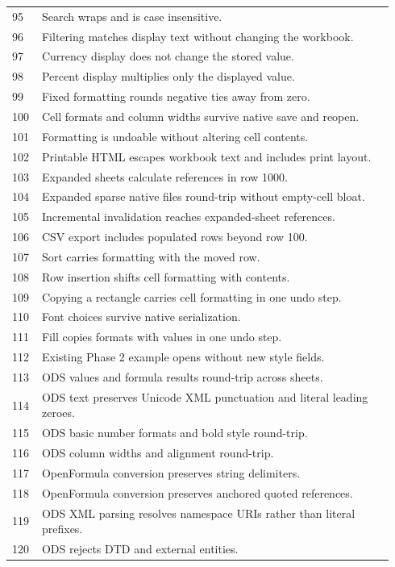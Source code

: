 \documentclass[11pt,letterpaper]{article}
\begin{document}
\begin{longtable}{@{}P{0.07\linewidth}P{0.87\linewidth}@{}}
95 & Search wraps and is case insensitive.\\
96 & Filtering matches display text without changing the workbook.\\
97 & Currency display does not change the stored value.\\
98 & Percent display multiplies only the displayed value.\\
99 & Fixed formatting rounds negative ties away from zero.\\
100 & Cell formats and column widths survive native save and reopen.\\
101 & Formatting is undoable without altering cell contents.\\
102 & Printable HTML escapes workbook text and includes print layout.\\
103 & Expanded sheets calculate references in row 1000.\\
104 & Expanded sparse native files round-trip without empty-cell bloat.\\
105 & Incremental invalidation reaches expanded-sheet references.\\
106 & CSV export includes populated rows beyond row 100.\\
107 & Sort carries formatting with the moved row.\\
108 & Row insertion shifts cell formatting with contents.\\
109 & Copying a rectangle carries cell formatting in one undo step.\\
110 & Font choices survive native serialization.\\
111 & Fill copies formats with values in one undo step.\\
112 & Existing Phase 2 example opens without new style fields.\\
113 & ODS values and formula results round-trip across sheets.\\
114 & ODS text preserves Unicode XML punctuation and literal leading zeroes.\\
115 & ODS basic number formats and bold style round-trip.\\
116 & ODS column widths and alignment round-trip.\\
117 & OpenFormula conversion preserves string delimiters.\\
118 & OpenFormula conversion preserves anchored quoted references.\\
119 & ODS XML parsing resolves namespace URIs rather than literal prefixes.\\
120 & ODS rejects DTD and external entities.\\

\end{longtable}
\end{document}
